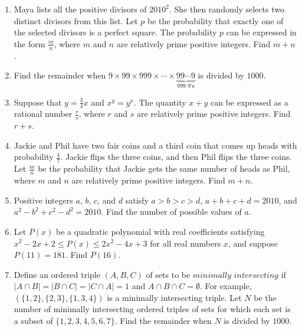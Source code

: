 \documentclass{article}
\begin{document}
\begin{enumerate}[label=\arabic*., itemsep=0.5em]\item Maya lists all the positive divisors of \(2010^2\). She then randomly selects two distinct divisors from this list. Let \(p\) be the probability that exactly one of the selected divisors is a perfect square. The probability \(p\) can be expressed in the form \(\frac {m}{n}\), where \(m\) and \(n\) are relatively prime positive integers. Find \(m + n\).\par \vspace{0.5em}\item Find the remainder when \(9 \times 99 \times 999 \times \cdots \times \underbrace{99\cdots9}_{\text{999 9's}}\) is divided by \(1000\).\par \vspace{0.5em}\item Suppose that \(y = \frac34x\) and \(x^y = y^x\). The quantity \(x + y\) can be expressed as a rational number \(\frac {r}{s}\), where \(r\) and \(s\) are relatively prime positive integers. Find \(r + s\).\par \vspace{0.5em}\item Jackie and Phil have two fair coins and a third coin that comes up heads with probability \(\frac47\). Jackie flips the three coins, and then Phil flips the three coins. Let \(\frac {m}{n}\) be the probability that Jackie gets the same number of heads as Phil, where \(m\) and \(n\) are relatively prime positive integers. Find \(m + n\).\par \vspace{0.5em}\item Positive integers \(a\), \(b\), \(c\), and \(d\) satisfy \(a > b > c > d\), \(a + b + c + d = 2010\), and \(a^2 - b^2 + c^2 - d^2 = 2010\). Find the number of possible values of \(a\).\par \vspace{0.5em}\item Let \(P(x)\) be a quadratic polynomial with real coefficients satisfying \(x^2 - 2x + 2 \le P(x) \le 2x^2 - 4x + 3\) for all real  numbers \(x\), and suppose \(P(11) = 181\). Find \(P(16)\).\par \vspace{0.5em}\item Define an ordered triple \((A, B, C)\) of sets to be \(\textit{minimally intersecting}\) if \(|A \cap B| = |B \cap C| = |C \cap A| = 1\) and \(A \cap B \cap C = \emptyset\). For example, \((\{1,2\},\{2,3\},\{1,3,4\})\) is a minimally intersecting triple. Let \(N\) be the number of minimally intersecting ordered triples of sets for which each set is a subset of \(\{1,2,3,4,5,6,7\}\). Find the remainder when \(N\) is divided by \(1000\).


\end{enumerate}
\end{document}
